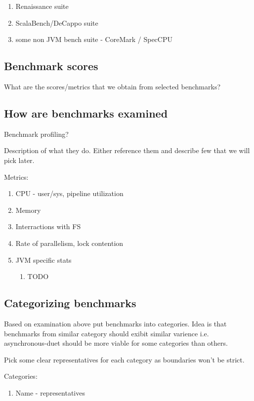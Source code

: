 \begin{enumerate}
	\item Renaissance suite
	\item ScalaBench/DeCappo suite
	\item some non JVM bench suite - CoreMark / SpecCPU
\end{enumerate}

\subsection{Benchmark scores}

What are the scores/metrics that we obtain from selected benchmarks?

\subsection{How are benchmarks examined}

Benchmark profiling?

Description of what they do. Either reference them and describe few that we will pick later.

Metrics:
\begin{enumerate}
	\item CPU - user/sys, pipeline utilization
	\item Memory 
	\item Interractions with FS
	\item Rate of parallelism, lock contention
	\item JVM specific stats
	\begin{enumerate}
		\item TODO
	\end{enumerate}
\end{enumerate}

\subsection{Categorizing benchmarks}
\label{sec:categorizing}

Based on examination above put benchmarks into categories.
Idea is that benchmarks from similar category should exibit similar varience i.e. asynchronous-duet should be more viable for some categories than others.

Pick some clear representatives for each category as boundaries won't be strict.

Categories:
\begin{enumerate}
	\item Name - representatives
\end{enumerate}
